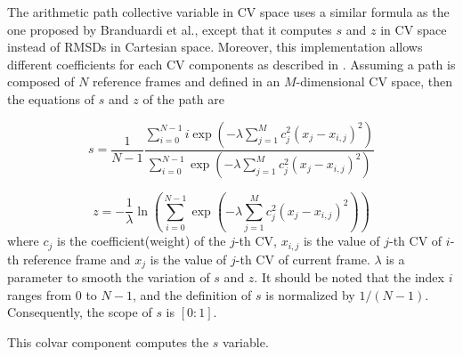 
The arithmetic path collective variable in CV space uses a similar formula as 
the one proposed by Branduardi\cite{Branduardi2007} et al., except that it 
computes $s$ and $z$ in CV space instead of RMSDs in Cartesian space. Moreover, 
this implementation allows different coefficients for each CV components as 
described in \cite{Hovan2019}. Assuming a path is composed of $N$ reference 
frames and defined in an $M$-dimensional CV space, then the equations of $s$ 
and $z$ of the path are

\begin{equation}
s = \frac{1}{N-1}\frac{\sum_{i=0}^{N-1} i \exp\left(-\lambda\sum_{j=1}^{M} 
c_j^2 \left(x_j-x_{i,j}\right)^2\right)}{\sum_{i=0}^{N-1} 
\exp\left(-\lambda\sum_{j=1}^{M} c_j^2 \left(x_j-x_{i,j}\right)^2\right)}
\label{eq:apath_s}
\end{equation}

\begin{equation}
z = -\frac{1}{\lambda} \ln \left(\sum_{i=0}^{N-1} 
\exp\left(-\lambda\sum_{j=1}^{M} c_j^2 \left(x_j-x_{i,j}\right)^2 \right)\right)
\label{eq:apath_z}
\end{equation}
where $c_j$ is the coefficient(weight) of the $j$-th CV, $x_{i,j}$ is the value 
of $j$-th CV of $i$-th reference frame and $x_{j}$ is the value of $j$-th CV of 
current frame. $\lambda$ is a parameter to smooth the variation of $s$ and $z$. 
It should be noted that the index $i$ ranges from $0$ to $N-1$, and the 
definition of $s$ is normalized by $1/(N-1)$. Consequently, the scope of $s$ is 
$[0:1]$.


This colvar component computes the $s$ variable.



